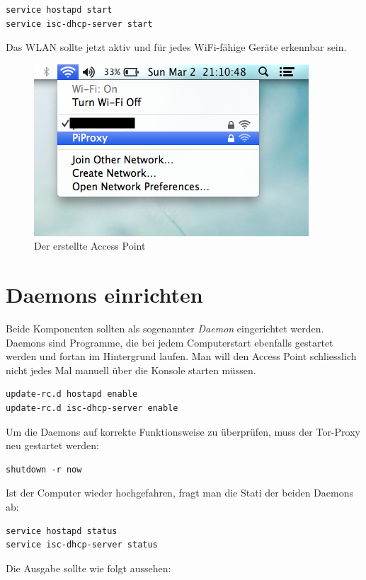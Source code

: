 \begin{lstlisting}
service hostapd start
service isc-dhcp-server start
\end{lstlisting}

Das WLAN sollte jetzt aktiv und für jedes WiFi-fähige Geräte erkennbar sein.

\begin{figure}[H]
\centering
\includegraphics[scale=0.7]{images/accesspoint}
\caption{Der erstellte Access Point}
\end{figure}

\section{Daemons einrichten}
Beide Komponenten sollten als sogenannter \textit{Daemon} eingerichtet werden. Daemons sind Programme, die bei jedem Computerstart ebenfalls gestartet werden und fortan im Hintergrund laufen. Man will den Access Point schliesslich nicht jedes Mal manuell über die Konsole starten müssen. 

\begin{lstlisting}
update-rc.d hostapd enable 
update-rc.d isc-dhcp-server enable
\end{lstlisting}

Um die Daemons auf korrekte Funktionsweise zu überprüfen, muss der Tor-Proxy neu gestartet werden:

\begin{lstlisting}
shutdown -r now 
\end{lstlisting}

Ist der Computer wieder hochgefahren, fragt man die Stati der beiden Daemons ab:

\begin{lstlisting}
service hostapd status
service isc-dhcp-server status
\end{lstlisting}

Die Ausgabe sollte wie folgt aussehen: 

